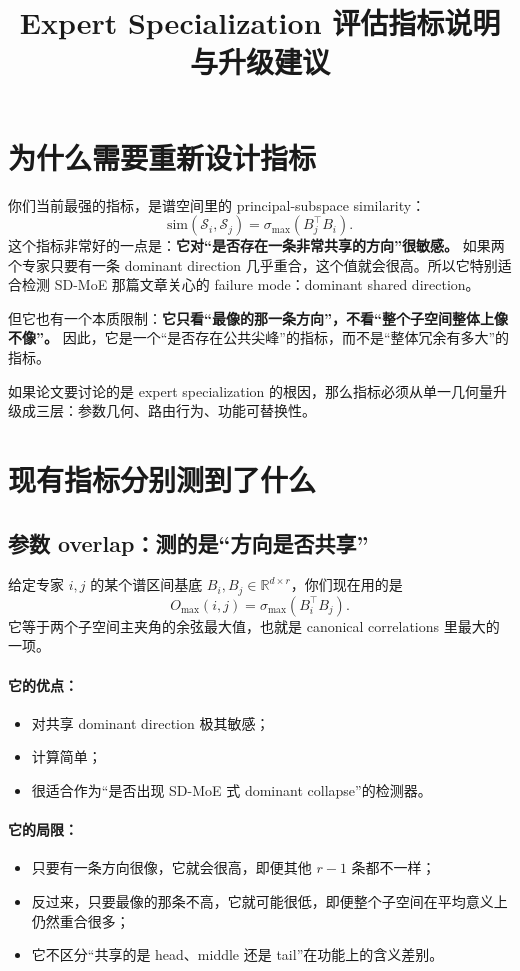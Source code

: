 \documentclass[11pt]{article}
\title{Expert Specialization 评估指标说明与升级建议}
\author{}
\date{}
\begin{document}
\maketitle

\section{为什么需要重新设计指标}

你们当前最强的指标，是谱空间里的 principal-subspace similarity：
\[
    \mathrm{sim}(\mathcal S_i,\mathcal S_j)=\sigma_{\max}(B_j^\top B_i).
\]
这个指标非常好的一点是：\textbf{它对“是否存在一条非常共享的方向”很敏感。} 如果两个专家只要有一条 dominant direction 几乎重合，这个值就会很高。所以它特别适合检测 SD-MoE 那篇文章关心的 failure mode：dominant shared direction。

但它也有一个本质限制：\textbf{它只看“最像的那一条方向”，不看“整个子空间整体上像不像”。} 因此，它是一个“是否存在公共尖峰”的指标，而不是“整体冗余有多大”的指标。

如果论文要讨论的是 expert specialization 的根因，那么指标必须从单一几何量升级成三层：参数几何、路由行为、功能可替换性。

\section{现有指标分别测到了什么}

\subsection{参数 overlap：测的是“方向是否共享”}
给定专家 $i,j$ 的某个谱区间基底 $B_i,B_j\in\mathbb R^{d\times r}$，你们现在用的是
\[
    O_{\max}(i,j)=\sigma_{\max}(B_i^\top B_j).
\]
它等于两个子空间主夹角的余弦最大值，也就是 canonical correlations 里最大的一项。

\paragraph{它的优点：}
\begin{itemize}
    \item 对共享 dominant direction 极其敏感；
    \item 计算简单；
    \item 很适合作为“是否出现 SD-MoE 式 dominant collapse”的检测器。
\end{itemize}

\paragraph{它的局限：}
\begin{itemize}
    \item 只要有一条方向很像，它就会很高，即便其他 $r-1$ 条都不一样；
    \item 反过来，只要最像的那条不高，它就可能很低，即便整个子空间在平均意义上仍然重合很多；
    \item 它不区分“共享的是 head、middle 还是 tail”在功能上的含义差别。
\end{itemize}
\end{document}
